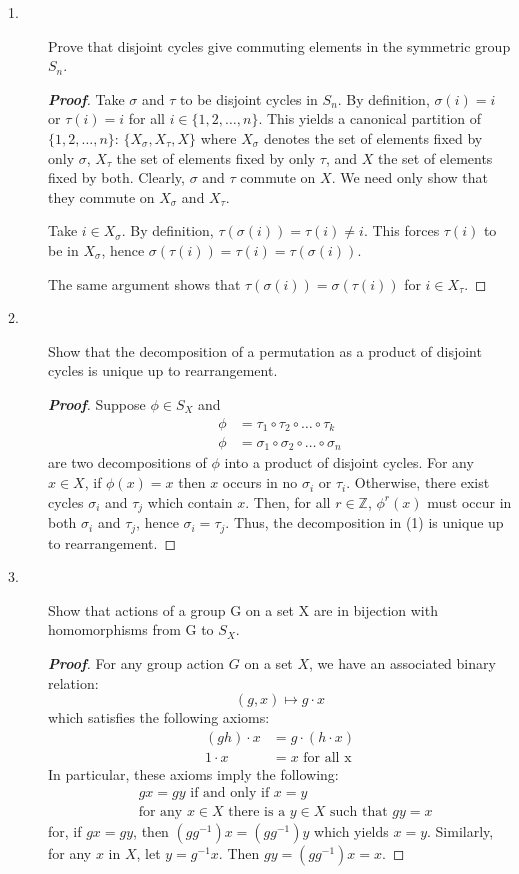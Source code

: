 \documentclass[12pt,leqno]{book}
\theoremstyle{definition}
\newcommand{\Z}{\mathbb{Z}}
\newenvironment{Proof}{\begin{proof}[\textnormal{\textbf{Proof}}]}{\end{proof}}
\begin{document}
 \begin{description}
  \item [1.] Prove that disjoint cycles give commuting elements in the symmetric group $S_n$.
  \begin{Proof}
   Take $\sigma$ and $\tau$ to be disjoint cycles in $S_n$. By definition, $\sigma(i)=i$ or $\tau(i)=i$ for all $i\in\{1,2,\hdots,n\}$. This yields a canonical partition of $\{1,2,\hdots,n\}$: $\{X_{\sigma},X_{\tau},X\}$ where $X_{\sigma}$ denotes the set of elements fixed by only $\sigma$, $X_{\tau}$ the set of elements fixed by only $\tau$, and $X$ the set of elements fixed by both. Clearly, $\sigma$ and $\tau$ commute on $X$. We need only show that they commute on $X_{\sigma}$ and $X_{\tau}$.

  Take $i\in X_{\sigma}$. By definition, $\tau(\sigma(i))=\tau(i)\not=i$. This forces $\tau(i)$ to be in $X_{\sigma}$, hence $\sigma(\tau(i))=\tau(i)=\tau(\sigma(i))$. 

The same argument shows that $\tau(\sigma(i))=\sigma(\tau(i))$ for $i\in X_{\tau}$.
  \end{Proof}
\item [2.] Show that the decomposition of a permutation as a product of disjoint cycles is unique up to rearrangement. 
\begin{Proof} 
 Suppose $\phi\in S_X$ and  \begin{align*}\tag{1}\phi&=\tau_1\circ\tau_2\circ\hdots\circ\tau_k\\\phi&=\sigma_1\circ\sigma_2\circ\hdots\circ\sigma_n\end{align*} are two decompositions of $\phi$ into a product of disjoint cycles. For any $x\in X$, if $\phi(x)=x$ then $x$ occurs in no $\sigma_i$ or $\tau_i$. Otherwise, there exist cycles $\sigma_i$ and $\tau_j$ which contain $x$. Then, for all $r\in\Z$, $\phi^r(x)$ must occur in both $\sigma_i$ and $\tau_j$, hence $\sigma_i=\tau_j$. Thus, the decomposition in (1) is unique up to rearrangement. \end{Proof}
\item [3.] Show that actions of a group G on a set X are in bijection with homomorphisms from G to $S_X$.
\begin{Proof}
 For any group action $G$ on a set $X$, we have an associated binary relation:\[(g,x)\mapsto g\cdot x\] which satisfies the following axioms: \begin{align*}(gh)\cdot x&=g\cdot(h\cdot x)\\1\cdot x&=x\text{ for all x}\end{align*} In particular, these axioms imply the following:\begin{align*}&gx=gy\text{ if and only if }x=y\\&\text{for any }x\in X\text{ there is a }y\in X\text{ such that }gy=x\end{align*} for, if $gx=gy$, then $(gg^{-1})x=(gg^{-1})y$ which yields $x=y$. Similarly, for any $x$ in $X$, let $y=g^{-1}x$. Then $gy=(gg^{-1})x=x$. 


\end{Proof}
\end{description}
\end{document}
